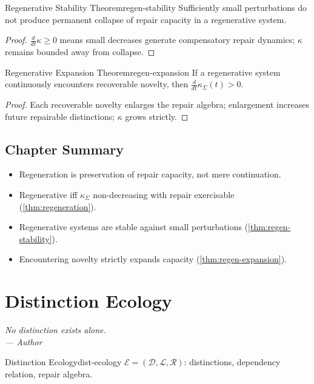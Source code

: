 \documentclass[12pt,twoside,openright]{book}
\newenvironment{epigraph}[2]{%
  \vspace{1em}\begin{flushright}
  \begin{minipage}{0.72\textwidth}
  \itshape\small #1\\[0.4em]
  \upshape\footnotesize\sffamily\color{DistGray}--- #2
  \end{minipage}\end{flushright}\vspace{1.5em}}{}
\newenvironment{chapsummary}{%
  \begin{tcolorbox}[colback=DistBlue!5,colframe=DistBlue,
    title={\faBookOpen\enspace Summary},
    fonttitle=\sffamily\bfseries\color{white},
    attach boxed title to top left={yshift=-2mm,xshift=4mm},
    boxed title style={colback=DistBlue,rounded corners}]
  \begin{itemize}[nosep,leftmargin=*]}{%
  \end{itemize}\end{tcolorbox}}
\begin{document}
\begin{theorem}{Regenerative Stability Theorem}{regen-stability}
  Sufficiently small perturbations do not produce permanent
  collapse of repair capacity in a regenerative system.
\end{theorem}
\begin{proof}
  $\frac{d}{dt}\kappa\ge0$ means small decreases generate
  compensatory repair dynamics; $\kappa$ remains bounded
  away from collapse.
\end{proof}

\begin{theorem}{Regenerative Expansion Theorem}{regen-expansion}
  If a regenerative system continuously encounters
  recoverable novelty, then
  $\frac{d}{dt}\kappa_\Sigma(t)>0$.
\end{theorem}
\begin{proof}
  Each recoverable novelty enlarges the repair algebra;
  enlargement increases future repairable distinctions;
  $\kappa$ grows strictly.
\end{proof}

\section*{Chapter Summary}
\begin{chapsummary}
  \item Regeneration is preservation of repair capacity,
        not mere continuation.
  \item Regenerative iff $\kappa_\Sigma$ non-decreasing
        with repair exercisable (\cref{thm:regeneration}).
  \item Regenerative systems are stable against small
        perturbations (\cref{thm:regen-stability}).
  \item Encountering novelty strictly expands capacity
        (\cref{thm:regen-expansion}).
\end{chapsummary}

\chapter{Distinction Ecology}
\label{ch:distinction-ecology}
\begin{epigraph}{No distinction exists alone.}{Author}
\end{epigraph}

\begin{definition}{Distinction Ecology}{dist-ecology}
  $\mathcal{E}=(\mathcal{D},\mathcal{L},\mathcal{R})$:
  distinctions, dependency relation, repair algebra.
\end{definition}
\end{document}
